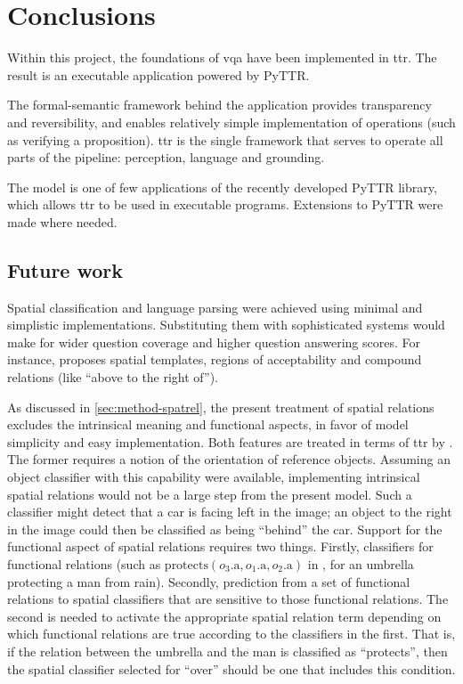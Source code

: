 \section{Conclusions}
\label{sec:conclusions}
\glsresetall

Within this project, the foundations of \gls{vqa} have been implemented in \gls{ttr}.
The result is an executable application powered by PyTTR.

The formal-semantic framework behind the application provides transparency and reversibility, and enables relatively simple implementation of operations (such as verifying a proposition).
\Gls{ttr} is the single framework that serves to operate all parts of the pipeline: perception, language and grounding.

The model is one of few applications of the recently developed PyTTR library, which allows \gls{ttr} to be used in executable programs.
Extensions to PyTTR were made where needed.



\subsection{Future work}

Spatial classification and language parsing were achieved using minimal and simplistic implementations.
Substituting them with sophisticated systems would make for wider question coverage and higher question answering scores.
For instance, \cite{LoganComputationalAnalysisApprehension1996} proposes spatial templates, regions of acceptability and compound relations (like ``above to the right of'').

As discussed in \autoref{sec:method-spatrel}, the present treatment of spatial relations excludes the intrinsical meaning and functional aspects, in favor of model simplicity and easy implementation.
Both features are treated in terms of \gls{ttr} by \cite{ttrspat}.
The former requires a notion of the orientation of reference objects.
Assuming an object classifier with this capability were available, implementing intrinsical spatial relations would not be a large step from the present model.
Such a classifier might detect that a car is facing left in the image;
an object to the right in the image could then be classified as being ``behind'' the car.
Support for the functional aspect of spatial relations requires two things.
Firstly, classifiers for functional relations (such as $\text{protects}(o_3\text{.a}, o_1\text{.a}, o_2\text{.a})$ in \cite{ttrspat}, for an umbrella protecting a man from rain).
Secondly, prediction from a set of functional relations to spatial classifiers that are sensitive to those functional relations.
The second is needed to activate the appropriate spatial relation term depending on which functional relations are true according to the classifiers in the first.
That is, if the relation between the umbrella and the man is classified as ``protects'', then the spatial classifier selected for ``over'' should be one that includes this condition.

